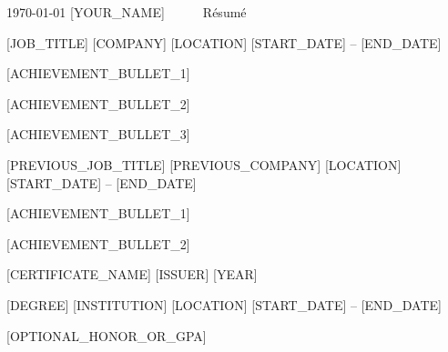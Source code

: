 \documentclass[11pt, a4paper]{awesome-cv}
\begin{document}
\makecvheader[C]

\makecvfooter
  {\today}
  {[YOUR_NAME]~~~\textperiodcentered~~~R\'esum\'e}
  {\thepage}

\begin{cvparagraph}
\end{cvparagraph}

\begin{cventries}

  \cventry
    {[JOB_TITLE]} %
    {[COMPANY]} %
    {[LOCATION]} %
    {[START_DATE] -- [END_DATE]} %
    {
      \begin{cvitems}
        \item {[ACHIEVEMENT_BULLET_1]}
        \item {[ACHIEVEMENT_BULLET_2]}
        \item {[ACHIEVEMENT_BULLET_3]}
      \end{cvitems}
    }

  \cventry
    {[PREVIOUS_JOB_TITLE]}
    {[PREVIOUS_COMPANY]}
    {[LOCATION]}
    {[START_DATE] -- [END_DATE]}
    {
      \begin{cvitems}
        \item {[ACHIEVEMENT_BULLET_1]}
        \item {[ACHIEVEMENT_BULLET_2]}
      \end{cvitems}
    }

\end{cventries}

\begin{cvhonors}
  \cvhonor
    {[CERTIFICATE_NAME]} %
    {[ISSUER]} %
    {} %
    {[YEAR]} %
\end{cvhonors}

\begin{cventries}
  \cventry
    {[DEGREE]} %
    {[INSTITUTION]} %
    {[LOCATION]} %
    {[START_DATE] -- [END_DATE]} %
    {
      \begin{cvitems}
        \item {[OPTIONAL_HONOR_OR_GPA]}
      \end{cvitems}
    }
\end{cventries}

\end{document}
